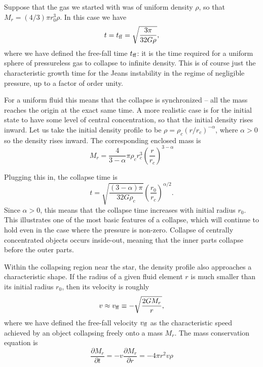 Suppose that the gas we started with was of uniform density $\rho$, so that $M_r = (4/3)\pi r_0^3 \rho$.
In this case we have
\begin{equation}
t = t_{\rm ff} = \sqrt{\frac{3\pi}{32 G \rho}},
\end{equation}
where we have defined the free-fall time $t_{\rm ff}$: it is the time required for a uniform sphere of pressureless gas to collapse to infinite density. This is of course just the characteristic growth time for the Jeans instability in the regime of negligible pressure, up to a factor of order unity.

For a uniform fluid this means that the collapse is synchronized -- all the mass reaches the origin at the exact same time. A more realistic case is for the initial state to have some level of central concentration, so that the initial density rises inward. Let us take the initial density profile to be $\rho = \rho_c (r/r_c)^{-\alpha}$, where $\alpha > 0$ so the density rises inward. The corresponding enclosed mass is
\begin{equation}
M_r = \frac{4}{3-\alpha}\pi \rho_c r_c^3 \left(\frac{r}{r_c}\right)^{3-\alpha} 
\end{equation}

Plugging this in, the collapse time is
\begin{equation}
t = \sqrt{\frac{(3-\alpha)\pi}{32 G \rho_c}} \left(\frac{r_0}{r_c}\right)^{\alpha/2}.
\end{equation}
Since $\alpha>0$, this means that the collapse time increases with initial radius $r_0$. This illustrates one of the most basic features of a collapse, which will continue to hold even in the case where the pressure is non-zero. Collapse of centrally concentrated objects occurs inside-out, meaning that the inner parts collapse before the outer parts.

Within the collapsing region near the star, the density profile also approaches a characteristic shape. If the radius of a given fluid element $r$ is much smaller than its initial radius $r_0$, then its velocity is roughly
\begin{equation}
v \approx v_{\rm ff}\equiv -\sqrt{\frac{2GM_r}{r}},
\end{equation}
where we have defined the free-fall velocity $v_{\rm ff}$ as the characteristic speed achieved by an object collapsing freely onto a mass $M_r$. The mass conservation equation is
\begin{equation}
\frac{\partial M_r}{\partial t} = -v\frac{\partial M_r}{\partial r}  = -4\pi r^2 v \rho
\end{equation}

